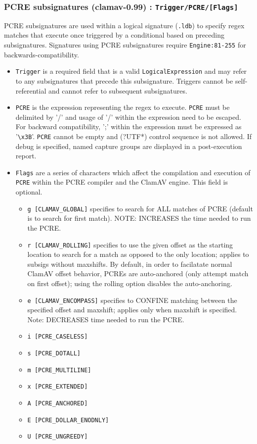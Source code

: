 \documentclass[a4paper,titlepage,12pt]{article}
\begin{document}
    \subsubsection{PCRE subsignatures (clamav-0.99) : \textnormal{\texttt{Trigger/PCRE/[Flags]}}}
    PCRE subsignatures are used within a logical signature (\verb+.ldb+) to specify regex matches
    that execute once triggered by a conditional based on preceding subsignatures. Signatures using
    PCRE subsignatures require \verb+Engine:81-255+ for backwards-compatibility.
    \begin{itemize}
    \item \verb+Trigger+ is a required field that is a valid \verb+LogicalExpression+ and
    may refer to any subsignatures that precede this subsignature. Triggers cannot be
    self-referential and cannot refer to subsequent subsignatures.
    \item \verb+PCRE+ is the expression representing the regex to execute. \verb+PCRE+
    must be delimited by '/' and usage of '/' within the expression need to be escaped.
    For backward compatibility, ';' within the expression must be expressed as '\verb+\x3B+'.
    \verb+PCRE+ cannot be empty and (?UTF*) control sequence is not allowed. If debug is specified,
    named capture groups are displayed in a post-execution report.
    \item \verb+Flags+ are a series of characters which affect the compilation and execution
    of \verb+PCRE+ within the PCRE compiler and the ClamAV engine. This field is optional.
	\begin{itemize}
	\item \verb+g [CLAMAV_GLOBAL]+ specifies to search for ALL matches of PCRE (default is to
        search for first match). NOTE: INCREASES the time needed to run the PCRE.
        \item \verb+r [CLAMAV_ROLLING]+ specifies to use the given offset as the starting location
        to search for a match as opposed to the only location; applies to subsigs without maxshifts.
        By default, in order to facilatate normal ClamAV offset behavior, PCREs are auto-anchored
        (only attempt match on first offset); using the rolling option disables the auto-anchoring.
	\item \verb+e [CLAMAV_ENCOMPASS]+ specifies to CONFINE matching between the specified offset
	and maxshift; applies only when maxshift is specified. Note: DECREASES time needed to run the PCRE.
	\item \verb+i [PCRE_CASELESS]+
	\item \verb+s [PCRE_DOTALL]+
	\item \verb+m [PCRE_MULTILINE]+
	\item \verb+x [PCRE_EXTENDED]+
	\item \verb+A [PCRE_ANCHORED]+
	\item \verb+E [PCRE_DOLLAR_ENODNLY]+
	\item \verb+U [PCRE_UNGREEDY]+
	\end{itemize}
    \end{itemize}
\end{document}
